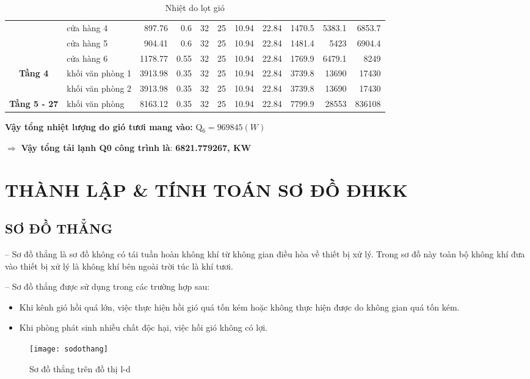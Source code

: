 \begin{landscape}
\begin{table}[H]
\begin{adjustbox}{width=1.5\textheight}
\begin{tabular}{|c|l|r|r|r|r|r|r|r|r|r|}
			\cline{2-11}             & cửa hàng 4 & 897.76   & 0.6      & 32       & 25       & 10.94    & 22.84    & 1470.5   & 5383.1   & 6853.7 \bigstrut\\
			\cline{2-11}             & cửa hàng 5 & 904.41   & 0.6      & 32       & 25       & 10.94    & 22.84    & 1481.4   & 5423     & 6904.4 \bigstrut\\
			\cline{2-11}             & cửa hàng 6 & 1178.77  & 0.55     & 32       & 25       & 10.94    & 22.84    & 1769.9   & 6479.1   & 8249 \bigstrut\\
			\hline
			\multirow{2}[4]{*}{\textbf{Tầng 4}} & khối văn phòng 1 & 3913.98  & 0.35     & 32       & 25       & 10.94    & 22.84    & 3739.8   & 13690    & 17430 \bigstrut\\
			\cline{2-11}             & khối văn phòng 2 & 3913.98  & 0.35     & 32       & 25       & 10.94    & 22.84    & 3739.8   & 13690    & 17430 \bigstrut\\
			\hline
			\textbf{Tầng 5 - 27} & khối văn phòng & 8163.12  & 0.35     & 32       & 25       & 10.94    & 22.84    & 7799.9   & 28553    & 836108 \bigstrut\\
			\hline
		\end{tabular}%
	\end{adjustbox}
		\caption{Nhiệt do lọt gió}
		\label{b:ndlg}%
	\end{table}%
\end{landscape}
\textbf{Vậy tổng nhiệt lượng do gió tươi mang vào:} Q$_{6} = 969845(W)$

$\Rightarrow$ \textbf{Vậy tổng tải lạnh Q{\scriptsize 0} công trình là}: \textbf{6821.779267, KW} 

\section{THÀNH LẬP \& TÍNH TOÁN SƠ ĐỒ ĐHKK}
\subsection{SƠ ĐỒ THẲNG}
-- Sơ đồ thẳng là sơ đồ không có tái tuần hoàn không khí từ không gian điều hòa về thiết bị xử lý. Trong sơ đồ này toàn bộ không khí đưa vào thiết bị xử lý là không khí bên ngoài trời túc là khí tươi.

-- Sơ đồ thẳng được sử dụng trong các trường hợp sau:
\begin{itemize}
	\item Khi kênh gió hồi quá lớn, việc thực hiện hồi gió quá tốn kém hoặc không thực hiện được do không gian quá tốn kém.
	\item Khi phòng phát sinh nhiều chất độc hại, việc hồi gió không có lợi.
\end{itemize}
\begin{figure}[H]
	\centering
	\caption{Sơ đồ thẳng trên đồ thị l-d}
	\texttt{[image: sodothang]}
\end{figure}
